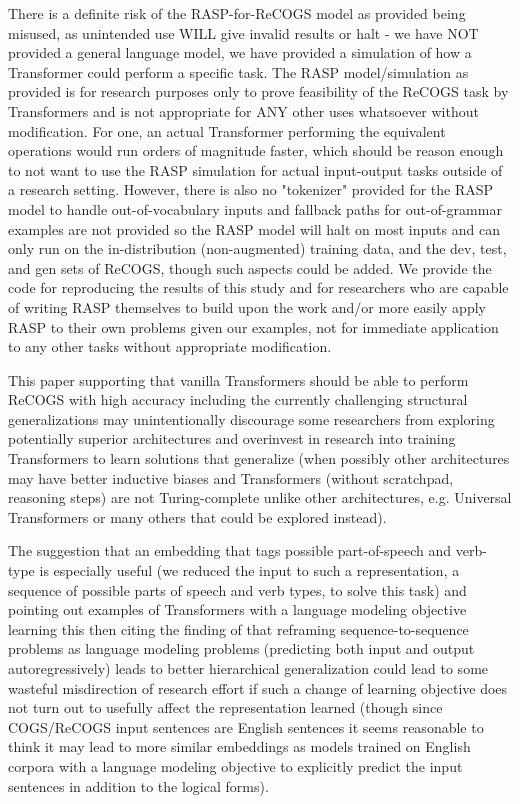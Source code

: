 \documentclass[11pt]{article}
\begin{document}
There is a definite risk of the RASP-for-ReCOGS model as provided being misused, as unintended use WILL give invalid results or halt - we have NOT provided a general language model, we have provided a simulation of how a Transformer could perform a specific task.
The RASP model/simulation as provided is for research purposes only to prove feasibility of the ReCOGS task by Transformers and is not appropriate for ANY other uses whatsoever without modification. For one, an actual Transformer performing the equivalent operations would run orders of magnitude faster, which should be reason enough to not want to use the RASP simulation for actual input-output tasks outside of a research setting. However, there is also no "tokenizer" provided for the RASP model to handle out-of-vocabulary inputs and fallback paths for out-of-grammar examples are not provided so the RASP model will halt on most inputs and can only run on the in-distribution (non-augmented) training data, and the dev, test, and gen sets of ReCOGS, though such aspects could be added. We provide the code for reproducing the results of this study and for researchers who are capable of writing RASP themselves to build upon the work and/or more easily apply RASP to their own problems given our examples, not for immediate application to any other tasks without appropriate modification.

This paper supporting that vanilla Transformers should be able to perform ReCOGS with high accuracy including the currently challenging structural generalizations may unintentionally discourage some researchers from exploring potentially superior architectures and overinvest in research into training Transformers to learn solutions that generalize (when possibly other architectures may have better inductive biases and Transformers (without scratchpad, reasoning steps) are not Turing-complete \cite{merrill2024expressivepowertransformerschain} \cite{delétang2023neuralnetworkschomskyhierarchy} \cite{Strobl2024} unlike other architectures, e.g. Universal Transformers \cite{Dehghani2019} or many others that could be explored instead).

The suggestion that an embedding that tags possible part-of-speech and verb-type is especially useful (we reduced the input to such a representation, a sequence of possible parts of speech and verb types, to solve this task) and pointing out examples of Transformers with a language modeling objective learning this \cite{tenney2019bertrediscoversclassicalnlp} then citing the finding of \cite{10.1162/tacl_a_00733} that reframing sequence-to-sequence problems as language modeling problems (predicting both input and output autoregressively) leads to better hierarchical generalization could lead to some wasteful misdirection of research effort if such a change of learning objective does not turn out to usefully affect the representation learned (though since COGS/ReCOGS input sentences are English sentences it seems reasonable to think it may lead to more similar embeddings as models trained on English corpora with a language modeling objective to explicitly predict the input sentences in addition to the logical forms).
\end{document}
